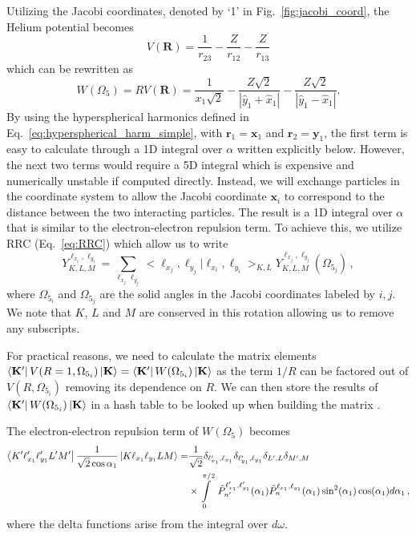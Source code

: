 Utilizing the Jacobi coordinates, denoted by `1' in Fig.~\ref{fig:jacobi_coord}, the Helium potential becomes
\begin{equation}
    V(\mathbf{R}) = \frac{1}{r_{23}} - \frac{Z}{r_{12}} - \frac{Z}{r_{13}}
\end{equation}
which can be rewritten as 
\begin{equation}
    W(\Omega_5) = R V(\mathbf{R}) = \frac{1}{x_1\sqrt{2}} - \frac{Z\sqrt{2}}{|\hat{y}_1+\hat{x}_1|} - \frac{Z\sqrt{2}}{|\hat{y}_1-\hat{x}_1|}.
\end{equation}
By using the hyperspherical harmonics defined in Eq.~\ref{eq:hyperspherical_harm_simple}, with $\mathbf{r}_1=\mathbf{x}_1$ and $\mathbf{r}_2=\mathbf{y}_1$, the first term is easy to calculate through a 1D integral over $\alpha$ written explicitly below. However, the next two terms would require a 5D integral which is expensive and numerically unstable if computed directly. Instead, we will exchange particles in the coordinate system to allow the Jacobi coordinate $\mathbf{x}_i$ to correspond to the distance between the two interacting particles. The result is a 1D integral over $\alpha$ that is similar to the electron-electron repulsion term. To achieve this, we utilize RRC (Eq.~\ref{eq:RRC}) which allow us to write
\begin{equation}
    Y^{\ell_{x_i},\ell_{y_i}}_{K,L,M} = \sum\limits_{\ell_{x_j}\ell_{y_j}} <\ell_{x_j},\ell_{y_j}|\ell_{x_i},\ell_{y_i}>_{K,L} Y^{\ell_{x_j},\ell_{y_j}}_{K,L,M}(\Omega_{5_j})\, ,
\end{equation}
where $\Omega_{5_i}$ and $\Omega_{5_j}$ are the solid angles in the Jacobi coordinates labeled by $i,j$. We note that $K$, $L$ and $M$ are conserved in this rotation allowing us to remove any subscripts. 

For practical reasons, we need to calculate the matrix elements $\bra{\mathbf{K}'}V(R=1,\Omega_{5_i})\ket{\mathbf{K}} = \bra{\mathbf{K}'}W(\Omega_{5_i})\ket{\mathbf{K}}$ as the term $1/R$ can be factored out of $V(R,\Omega_{5_i})$ removing its dependence on $R$. We can then store the results of $\bra{\mathbf{K}'}W(\Omega_{5_i})\ket{\mathbf{K}}$ in a hash table to be looked up when building the matrix \cite{khan2015}.

The electron-electron repulsion term of $W(\Omega_5)$ becomes
\begin{align}
    \bra{K'\ell_{x_1}'\ell_{y_1}'L'M'} \frac{1}{\sqrt{2}\cos\alpha_1} \ket{K \ell_{x_1} \ell_{y_1}LM} =& \frac{1}{\sqrt{2}} \delta_{\ell_{x_1}',\ell_{x_1}} \delta_{\ell_{y_1}',\ell_{y_1}} \delta_{L',L} \delta_{M',M} \\
    & \times \int\limits_0^{\pi/2}\ \tilde{P}^{\ell_{x_1}',\ell_{y_1}'}_{n'}(\alpha_1) \tilde{P}^{\ell_{x_1},\ell_{y_1}}_{n}(\alpha_1) \sin^2(\alpha_1) \cos(\alpha_1)d\alpha_1\, ,
\end{align}
where the delta functions arise from the integral over $d\omega$.

